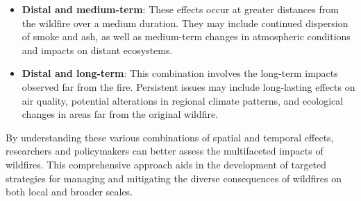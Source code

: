 \documentclass[
  12 pt,
]{Nemilov}
\begin{document}
\begin{enumerate}
\begin{itemize}
  \item
    \textbf{Distal and medium-term}: These effects occur at greater distances from the wildfire over a medium duration. They may include continued dispersion of smoke and ash, as well as medium-term changes in atmospheric conditions and impacts on distant ecosystems.
  \item
    \textbf{Distal and long-term}: This combination involves the long-term impacts observed far from the fire. Persistent issues may include long-lasting effects on air quality, potential alterations in regional climate patterns, and ecological changes in areas far from the original wildfire.
  \end{itemize}
\end{enumerate}

By understanding these various combinations of spatial and temporal effects, researchers and policymakers can better assess the multifaceted impacts of wildfires. This comprehensive approach aids in the development of targeted strategies for managing and mitigating the diverse consequences of wildfires on both local and broader scales.
\end{document}
